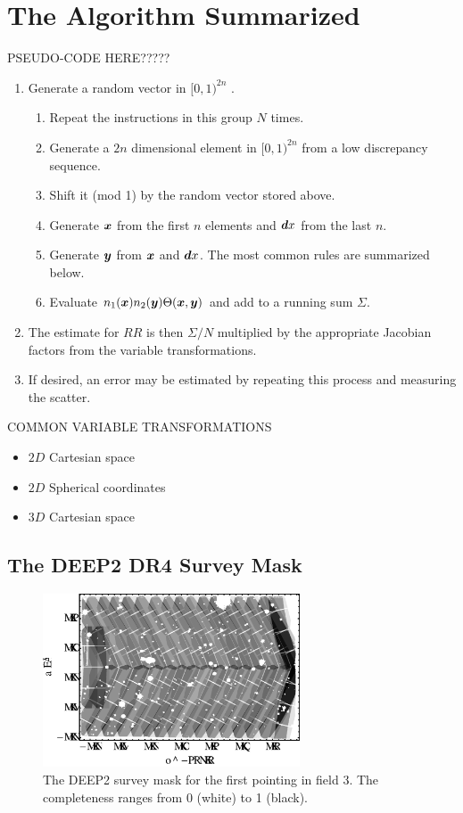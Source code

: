 \documentclass[usenatbib]{mn2e}
\begin{document}
\section{The Algorithm Summarized}
\label{sec:alg}

PSEUDO-CODE HERE?????
\begin{enumerate}
  \item Generate a random vector in $[0,1)^{2n}$ .
  \begin{enumerate}
    \item Repeat the instructions in this group $N$ times.
    \item Generate a $2n$ dimensional element in $[0,1)^{2n}$ from a low
    discrepancy sequence.
    \item Shift it (mod 1) by the random vector stored above.
    \item Generate ${\bm x}$ from the first $n$ elements and ${\bm dx}$ from the last
    $n$.
    \item Generate ${\bm y}$ from ${\bm x}$ and ${\bm dx}$. The most common rules are
    summarized below.
    \item Evaluate $n_1({\bm x}) n_2({\bm y}) \Theta({\bm x}, {\bm y})$ and add to a running sum
    $\Sigma$.
  \end{enumerate}
  \item The estimate for $RR$ is then $\Sigma/N$ multiplied by the appropriate
  Jacobian factors from the variable transformations. 
  \item If desired, an error may be estimated by repeating this process and
  measuring the scatter. 
\end{enumerate}

COMMON VARIABLE TRANSFORMATIONS
\begin{itemize}
  \item $2D$ Cartesian space
  \item $2D$ Spherical coordinates
  \item $3D$ Cartesian space
\end{itemize}

\subsection{The DEEP2 DR4 Survey Mask}

\begin{figure}
\includegraphics[width=3in]{plots/deep2mask}
\caption{The DEEP2 survey mask for the first pointing in field 3. The
completeness ranges from 0 (white) to 1 (black). }
\label{fig:deep2mask}
\end{figure}
\end{document}
